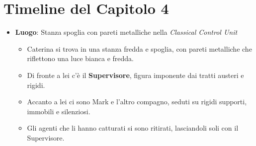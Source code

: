 \section*{Timeline del Capitolo 4}


\begin{itemize}
    \item \textbf{Luogo}: Stanza spoglia con pareti metalliche nella \emph{Classical Control Unit}
    \begin{itemize}
        \item Caterina si trova in una stanza fredda e spoglia, con pareti metalliche che riflettono una luce bianca e fredda.
        \item Di fronte a lei c'è il \textbf{Supervisore}, figura imponente dai tratti austeri e rigidi.
        \item Accanto a lei ci sono Mark e l'altro compagno, seduti su rigidi supporti, immobili e silenziosi.
        \item Gli agenti che li hanno catturati si sono ritirati, lasciandoli soli con il Supervisore.
    \end{itemize}
\end{itemize}


